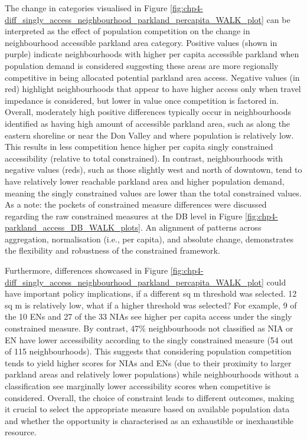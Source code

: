 \documentclass[
11pt, %
oneside, %
english, %
singlespacing, %
]{macthesis} %
\begin{document}
The change in categories visualised in Figure \ref{fig:chp4-diff_singly_access_neighbourhood_parkland_percapita_WALK_plot} can be interpreted as the effect of population competition on the change in neighbourhood accessible parkland area category. Positive values (shown in purple) indicate neighbourhoods with higher per capita accessible parkland when population demand is considered suggesting these areas are more regionally competitive in being allocated potential parkland area access. Negative values (in red) highlight neighbourhoods that appear to have higher access only when travel impedance is considered, but lower in value once competition is factored in. Overall, moderately high positive differences typically occur in neighbourhoods identified as having high amount of accessible parkland area, such as along the eastern shoreline or near the Don Valley and where population is relatively low. This results in less competition hence higher per capita singly constrained accessibility (relative to total constrained). In contrast, neighbourhoods with negative values (reds), such as those slightly west and north of downtown, tend to have relatively lower reachable parkland area and higher population demand, meaning the singly constrained values are lower than the total constrained values. As a note: the pockets of constrained measure differences were discussed regarding the raw constrained measures at the DB level in Figure \ref{fig:chp4-parkland_access_DB_WALK_plots}. An alignment of patterns across aggregation, normalisation (i.e., per capita), and absolute change, demonstrates the flexibility and robustness of the constrained framework.

Furthermore, differences showcased in Figure \ref{fig:chp4-diff_singly_access_neighbourhood_parkland_percapita_WALK_plot} could have important policy implications, if a different sq m threshold was selected. 12 sq m is relatively low, what if a higher threshold was selected? For example, 9 of the 10 ENs and 27 of the 33 NIAs see higher per capita access under the singly constrained measure. By contrast, 47\% neighbourhoods not classified as NIA or EN have lower accessibility according to the singly constrained measure (54 out of 115 neighbourhoods). This suggests that considering population competition tends to yield higher scores for NIAs and ENs (due to their proximity to larger parkland areas and relatively lower populations) while neighbourhoods without a classification see marginally lower accessibility scores when competitive is considered. Overall, the choice of constraint leads to different outcomes, making it crucial to select the appropriate measure based on available population data and whether the opportunity is characterised as an exhaustible or inexhaustible resource.
\end{document}
